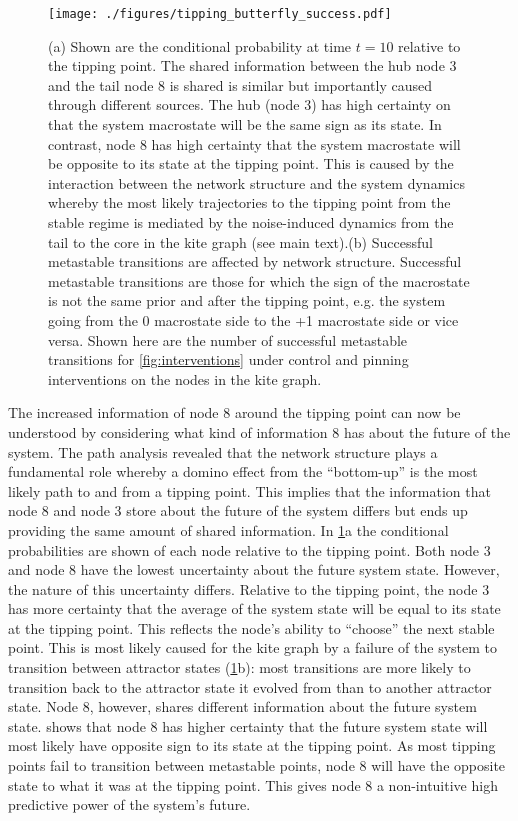 \documentclass[a4paper, 11pt, twocolumn]{article}
\begin{document}
\begin{figure}
\centering
\texttt{[image: ./figures/tipping\_butterfly\_success.pdf]}
\caption{\label{fig:butterfly}(a) Shown are the conditional probability at time \(t=10\) relative to the tipping point. The shared information between the hub node 3 and the tail node 8 is shared is similar but importantly caused through different sources. The hub (node 3) has high certainty on that the system macrostate will be the same sign as its state. In contrast, node 8 has high certainty that the system macrostate will be opposite to its state at the tipping point. This is caused by the interaction between the network structure and the system dynamics whereby the most likely trajectories to the tipping point from the stable regime is mediated by the noise-induced dynamics from the tail to the core in the kite graph (see main text).(b) Successful metastable transitions are affected by network structure. Successful metastable transitions are those for which the sign of the macrostate is not the same prior and after the tipping point, e.g. the system going from the 0 macrostate side to the +1 macrostate side or vice versa. Shown here are the number of successful metastable transitions for \cref{fig:interventions} under control and pinning interventions on the nodes in the kite graph.}
\end{figure}

The increased information of node 8 around the tipping point
can  now   be  understood   by  considering  what   kind  of
information 8 has  about the future of the  system. The path
analysis  revealed  that  the   network  structure  plays  a
fundamental   role  whereby   a  domino   effect  from   the
``bottom-up'' is  the most likely  path to and from  a tipping
point. This  implies that  the information  that node  8 and
node 3 store about the future of the system differs but ends
up  providing  the same  amount  of  shared information.  In
\cref{fig:butterfly}{a}  the  conditional probabilities  are
shown of each node relative  to the tipping point. Both node
3 and  node 8 have  the lowest uncertainty about  the future
system  state.  However,  the  nature  of  this  uncertainty
differs. Relative to the tipping  point, the node 3 has more
certainty that the average of the system state will be equal
to its state at the  tipping point. This reflects the node's
ability  to ``choose''  the next  stable point.  This is  most
likely caused for the kite graph  by a failure of the system
to       transition      between       attractor      states
(\cref{fig:butterfly}{b}): most transitions  are more likely
to transition  back to the  attractor state it  evolved from
than  to another  attractor state.  Node 8,  however, shares
different  information   about  the  future   system  state.
 shows that node  8 has higher certainty
that the future system state  will most likely have opposite
sign  to its  state at  the tipping  point. As  most tipping
points fail to transition  between metastable points, node 8
will have the  opposite state to what it was  at the tipping
point.  This gives  node 8  a non-intuitive  high predictive
power of the system's future.
\end{document}
